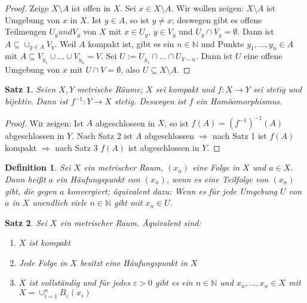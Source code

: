 \documentclass[10pt,a4paper]{report}
\newtheorem{satz}{Satz}
\newtheorem*{defi}{Definition}
\begin{document}
\begin{proof}
  Zeige $X \setminus A$ ist offen in $X$.
  Sei $x \in X \setminus A$.
  Wir wollen zeigen: $X \setminus A$ ist Umgebung von $x$ in $X$.
  Ist $y \in A$, so ist $y \ne x$; deswegen gibt es offene Teilmengen $U_{y} und V_{y}$ von $X$ mit $x \in U_{y}$, $y \in V_{y}$ und $U_{y} \cap V_{y} = \emptyset$.
  Dann ist $A \subseteq \cup_{y \in A} V_{y}$.
  Weil $A$ kompakt ist, gibt es ein $n \in \mathbb{N}$ und Punkte $y_{1}, \dots, y_{n} \in A$ mit $A \subseteq V_{y_{1}} \cup \dots \cup V_{y_{n}} = V$.
  Sei $U := U_{y_{1}} \cap \dots \cap U_{Y-n}$.
  Dann ist $U$ eine offene Umgebung von $x$ mit $U \cap V = \emptyset$, also $U \subseteq X \setminus A$.
\end{proof}

\begin{satz}
  Seien $X, Y$ metrische Räume; $X$ sei kompakt und $f : X \rightarrow Y$ sei stetig und bijektiv.
  Dann ist $f^{-1} : Y \rightarrow X$ stetig.
  Deswegen ist $f$ ein Homöomorphismus.
\end{satz}

\begin{proof}
  Wir zeigen: Ist $A$ abgeschlossen in $X$, so ist $f(A) = (f^{-1})^{-1}(A)$ abgeschlossen in $Y$.
  Nach Satz 2 ist $A$ abgeschlossen $\Rightarrow$ nach Satz 1 ist $f(A)$ kompakt $\Rightarrow$ nach Satz 3 $f(A)$ ist abgeschlossen in $Y$.
\end{proof}

\begin{defi}
  Sei $X$ ein metrischer Raum, $(x_{n})$ eine Folge in $X$ und $a \in X$.
  Dann heißt $a$ ein Häufungspunkt von $(x_{n})$, wenn es eine Teilfolge von $(x_{n})$ gibt, die gegen $a$ konvergiert; äquivalent dazu: Wenn es für jede Umgebung $U$ von $a$ in $X$ unendlich viele $n \in \mathbb{N}$ gibt mit $x_{n} \in U$.
\end{defi}

\begin{satz}
  Sei $X$ ein metrischer Raum.
  Äquivalent sind:
  \begin{enumerate}[label={\alph*)}]
  \item $X$ ist kompakt
  \item Jede Folge in $X$ besitzt eine Häufungspunkt in $X$
  \item $X$ ist vollständig und für jedes $\varepsilon > 0$ gibt es ein $n \in \mathbb{N}$ und $x_{n}, \dots, x_{n} \in X$ mit $X = \cup_{i = 1}^{n} B_{\varepsilon}(x_{i})$
  \end{enumerate}
\end{satz}
\end{document}
